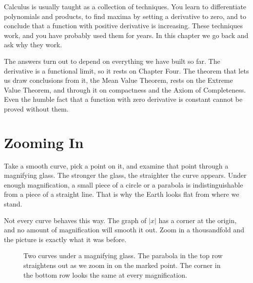 
Calculus is usually taught as a collection of techniques.  You learn to differentiate polynomials and products, to find maxima by setting a derivative to zero, and to conclude that a function with positive derivative is increasing.  These techniques work, and you have probably used them for years.  In this chapter we go back and ask why they work.

The answers turn out to depend on everything we have built so far.  The derivative is a functional limit, so it rests on Chapter Four.  The theorem that lets us draw conclusions from it, the Mean Value Theorem, rests on the Extreme Value Theorem, and through it on compactness and the Axiom of Completeness.  Even the humble fact that a function with zero derivative is constant cannot be proved without them.

\section{Zooming In}\label{sec:zooming}

Take a smooth curve, pick a point on it, and examine that point through a magnifying glass.  The stronger the glass, the straighter the curve appears.  Under enough magnification, a small piece of a circle or a parabola is indistinguishable from a piece of a straight line.  That is why the Earth looks flat from where we stand.

Not every curve behaves this way.  The graph of $|x|$ has a corner at the origin, and no amount of magnification will smooth it out.  Zoom in a thousandfold and the picture is exactly what it was before.

\begin{figure}
\centering
{}
\caption{Two curves under a magnifying glass.  The parabola in the top row straightens out as we zoom in on the marked point.  The corner in the bottom row looks the same at every magnification.}
\label{fig:zoom}
\end{figure}

